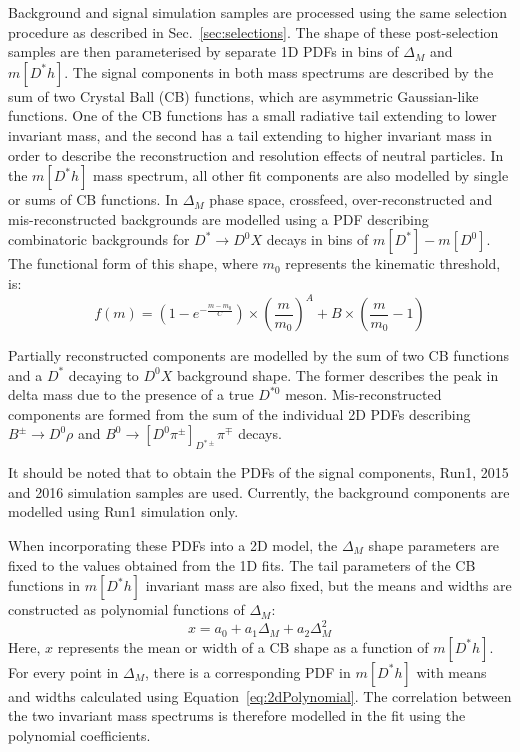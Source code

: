 \documentclass[oneside,12pt]{article}
\begin{document}
Background and signal simulation samples are processed using the same selection
procedure as described in Sec.~\ref{sec:selections}. The shape of these
post-selection samples are then parameterised by separate 1D PDFs in bins of
$\Delta_M$ and $m[D^*h]$. The signal components in both mass spectrums are
described by the sum of two Crystal Ball (CB) functions, which are asymmetric
Gaussian-like functions. One of the CB functions has a small radiative tail
extending to lower invariant mass, and the second has a tail extending to higher
invariant mass in order to describe the reconstruction and resolution effects of
neutral particles. In the $m[D^*h]$ mass spectrum, all other fit components are
also modelled by single or sums of CB functions. In $\Delta_M$ phase space,
crossfeed, over-reconstructed and mis-reconstructed backgrounds are modelled
using a PDF describing combinatoric backgrounds for $D^{*}\rightarrow D^{0}X$
decays in bins of $m[D^*]-m[D^0]$. The functional form of this shape, where $m_0$
represents the kinematic threshold, is:
\begin{equation}
f(m)=\left(  1-e^{-\frac{m-m_0}{C}}\right) \times\left(  \frac{m}{m_0}\right) ^A+B\times\left(  \frac{m}{m_0}-1\right) 
\label{eq:DstD0BG}
\end{equation}

Partially reconstructed components are modelled by the sum of two CB functions
and a $D^*$ decaying to $D^0X$ background shape. The former describes the peak
in delta mass due to the presence of a true $D^{*0}$ meson. Mis-reconstructed
components are formed from the sum of the individual 2D PDFs describing
$B^{\pm}\rightarrow D^0\rho$ and
$B^{0}\rightarrow[D^0\pi^{\pm}]_{D^{*\pm}}\pi^{\mp}$ decays.

It should be noted that to obtain the PDFs of the signal components, Run1, 2015
and 2016 simulation samples are used. Currently, the background components are
modelled using Run1 simulation only. 

When incorporating these PDFs into a 2D model, the $\Delta_M$ shape parameters
are fixed to the values obtained from the 1D fits. The tail parameters of the CB
functions in $m[D^*h]$ invariant mass are also fixed, but the means and widths
are constructed as polynomial functions of $\Delta_M$:  
\begin{equation}
x = a_0 + a_1 \Delta_M + a_2 \Delta_M^2
\label{eq:2dPolynomial}
\end{equation}
Here, $x$ represents the mean or width of a CB shape as a function of $m[D^*h]$.
For every point in $\Delta_M$, there is a corresponding PDF in $m[D^*h]$ with
means and widths calculated using Equation~\ref{eq:2dPolynomial}. The
correlation between the two invariant mass spectrums is therefore modelled in
the fit using the polynomial coefficients.
\end{document}
